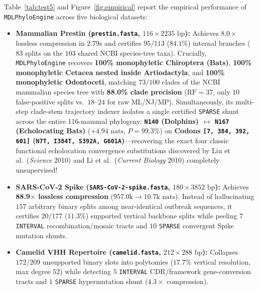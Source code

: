 \documentclass[11pt,a4paper]{article}
\begin{document}
Table~\ref{tab:test5} and Figure~\ref{fig:empirical} report the empirical performance of \texttt{MDLPhyloEngine} across five biological datasets:
\begin{itemize}[leftmargin=1.8em]
    \item \textbf{Mammalian Prestin (\texttt{prestin.fasta}, $116 \times 2235\text{ bp}$):} Achieves $8.0\times$ lossless compression in $2.79\text{s}$ and certifies $95/113$ ($84.1\%$) internal branches ($83$ splits on the $103$ shared NCBI species-tree taxa). Crucially, \texttt{MDLPhyloEngine} recovers \textbf{100\% monophyletic Chiroptera (Bats)}, \textbf{100\% monophyletic Cetacea nested inside Artiodactyla}, and \textbf{100\% monophyletic Odontoceti}, matching $73/100$ clades of the NCBI mammalian species tree with \textbf{88.0\% clade precision} ($\text{RF} = 37$, only $10$ false-positive splits vs.\ $18\text{--}24$ for raw ML/NJ/MP). Simultaneously, its multi-step clade-stem trajectory indexer isolates a single certified \texttt{SPARSE} shunt across the entire 116-mammal phylogeny: \textbf{\texttt{N140} (Dolphins) $\leftrightarrow$ \texttt{N167} (Echolocating Bats)} ($+4.94\text{ nats}$, $P = 99.3\%$) on \textbf{Codons \texttt{[7, 384, 392, 601]} (\texttt{N7T, I384T, S392A, G601A})}---recovering the exact four classic functional echolocation convergence substitutions discovered by Liu et al.\ (\emph{Science} 2010) and Li et al.\ (\emph{Current Biology} 2010) completely unsupervised!
    \item \textbf{SARS-CoV-2 Spike (\texttt{SARS-CoV-2-spike.fasta}, $180 \times 3852\text{ bp}$):} Achieves \textbf{88.9$\times$ lossless compression} ($957.0\text{k} \to 10.7\text{k nats}$). Instead of hallucinating $157$ arbitrary binary splits among near-identical outbreak sequences, it certifies $20/177$ ($11.3\%$) supported vertical backbone splits while peeling $7$ \texttt{INTERVAL} recombination/mosaic tracts and $10$ \texttt{SPARSE} convergent Spike mutation shunts.
    \item \textbf{Camelid VHH Repertoire (\texttt{camelid.fasta}, $212 \times 288\text{ bp}$):} Collapses $172/209$ unsupported binary slots into polytomies ($17.7\%$ vertical resolution, max degree $52$) while detecting $5$ \texttt{INTERVAL} CDR/framework gene-conversion tracts and $1$ \texttt{SPARSE} hypermutation shunt ($4.3\times$ compression).
\end{itemize}
\end{document}
